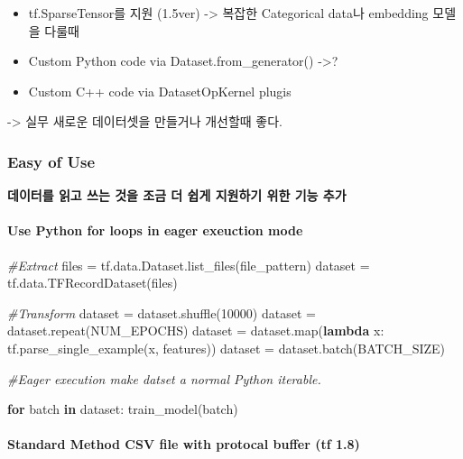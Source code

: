 \documentclass[11pt]{article}
\newenvironment{Shaded}{}{}
\newcommand{\KeywordTok}[1]{\textcolor[rgb]{0.00,0.44,0.13}{\textbf{{#1}}}}
\newcommand{\DecValTok}[1]{\textcolor[rgb]{0.25,0.63,0.44}{{#1}}}
\newcommand{\CommentTok}[1]{\textcolor[rgb]{0.38,0.63,0.69}{\textit{{#1}}}}
\newcommand{\NormalTok}[1]{{#1}}
\newcommand{\ControlFlowTok}[1]{\textcolor[rgb]{0.00,0.44,0.13}{\textbf{{#1}}}}
\newcommand{\OperatorTok}[1]{\textcolor[rgb]{0.40,0.40,0.40}{{#1}}}
\newcommand{\BuiltInTok}[1]{{#1}}
\begin{document}
\begin{itemize}
\item
  tf.SparseTensor를 지원 (1.5ver) -\textgreater{} 복잡한 Categorical
  data나 embedding 모델을 다룰때
\item
  Custom Python code via Dataset.from\_generator() -\textgreater{}?
\item
  Custom C++ code via DatasetOpKernel plugis
\end{itemize}

-\textgreater{} 실무 새로운 데이터셋을 만들거나 개선할때 좋다.

    \hypertarget{easy-of-use}{%
\subsubsection{Easy of Use}\label{easy-of-use}}

\textbf{데이터를 읽고 쓰는 것을 조금 더 쉽게 지원하기 위한 기능 추가}

\hypertarget{use-python-for-loops-in-eager-exeuction-mode}{%
\paragraph{Use Python for loops in eager exeuction
mode}\label{use-python-for-loops-in-eager-exeuction-mode}}

\begin{Shaded}
\begin{Highlighting}[]
\CommentTok{#Extract}
\NormalTok{files }\OperatorTok{=}\NormalTok{ tf.data.Dataset.list_files(file_pattern)}
\NormalTok{dataset }\OperatorTok{=}\NormalTok{ tf.data.TFRecordDataset(files)}

\CommentTok{#Transform}
\NormalTok{dataset }\OperatorTok{=}\NormalTok{ dataset.shuffle(}\DecValTok{10000}\NormalTok{)}
\NormalTok{dataset }\OperatorTok{=}\NormalTok{ dataset.repeat(NUM_EPOCHS)}
\NormalTok{dataset }\OperatorTok{=}\NormalTok{ dataset.}\BuiltInTok{map}\NormalTok{(}\KeywordTok{lambda}\NormalTok{ x: tf.parse_single_example(x, features))}
\NormalTok{dataset }\OperatorTok{=}\NormalTok{ dataset.batch(BATCH_SIZE)}

\CommentTok{#Eager execution make datset a normal Python iterable.}

\ControlFlowTok{for}\NormalTok{ batch }\KeywordTok{in}\NormalTok{ dataset:}
\NormalTok{    train_model(batch)}
\end{Highlighting}
\end{Shaded}

\hypertarget{standard-method-csv-file-with-protocal-buffer-tf-1.8}{%
\paragraph{Standard Method CSV file with protocal buffer (tf
1.8)}\label{standard-method-csv-file-with-protocal-buffer-tf-1.8}}
\end{document}
